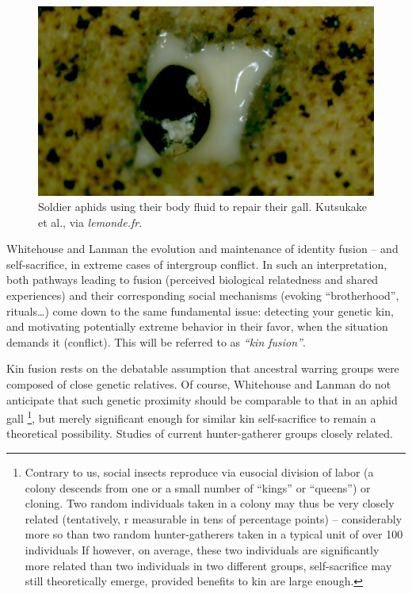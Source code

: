 \documentclass[a4paper,12pt]{report}
\begin{document}
\begin{figure}
    \centering
    \includegraphics[width=1\textwidth]{aphid}
    \caption{Soldier aphids using their body fluid to repair their gall. Kutsukake et al.,
    via \textit{lemonde.fr}.}
    \label{}
\end{figure}
    
Whitehouse and Lanman %
the evolution and maintenance of identity fusion – and self-sacrifice,
in extreme cases of intergroup conflict. In such an interpretation, 
both pathways leading to fusion (perceived biological relatedness and shared experiences)
and their corresponding social mechanisms (evoking “brotherhood”, rituals…)
come down to the same fundamental issue: detecting your genetic kin, and motivating
potentially extreme behavior in their favor, when the situation demands it (conflict).
This will be referred to as \emph{“kin fusion”}.

Kin fusion rests on the debatable assumption that ancestral warring groups were 
composed of close genetic relatives. Of course, Whitehouse and Lanman do not anticipate
that such genetic proximity should be comparable to that in an aphid gall
\footnote{Contrary to us, social insects reproduce via eusocial division of labor
(a colony descends from one or a small number of “kings” or “queens”) or cloning.
Two random individuals taken in a colony may thus be very closely related (tentatively,
r measurable in tens of percentage points) – considerably more so than
two random hunter-gatherers taken in a typical unit of over 100 individuals %
If however, on average, these two individuals are significantly more related than
two individuals in two different groups, self-sacrifice may still theoretically emerge,
provided benefits to kin are large enough.},
but merely significant enough for similar kin self-sacrifice to remain a theoretical
possibility. Studies of current hunter-gatherer groups %
closely related.
\end{document}
